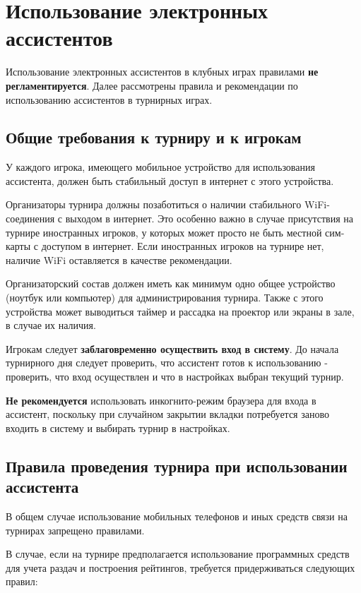 \section{Использование электронных ассистентов}

Использование электронных ассистентов в клубных играх правилами \textbf{не регламентируется}. Далее рассмотрены правила и рекомендации по использованию ассистентов в турнирных играх.

\subsection{Общие требования к турниру и к игрокам}

У каждого игрока, имеющего мобильное устройство для использования ассистента, должен быть стабильный доступ в интернет с этого устройства.

Организаторы турнира должны позаботиться о наличии стабильного WiFi-соединения с выходом в интернет. Это особенно важно в случае присутствия на турнире иностранных игроков, у которых может просто не быть местной сим-карты с доступом в интернет. Если иностранных игроков на турнире нет, наличие WiFi оставляется в качестве рекомендации.

Организаторский состав должен иметь как минимум одно общее устройство (ноутбук или компьютер) для администрирования турнира. Также с этого устройства может выводиться таймер и рассадка на проектор или экраны в зале, в случае их наличия.

Игрокам следует \textbf{заблаговременно осуществить вход в систему}. До начала турнирного дня следует проверить, что ассистент готов к использованию - проверить, что вход осуществлен и что в настройках выбран текущий турнир.

\textbf{Не рекомендуется} использовать инкогнито-режим браузера для входа в ассистент, поскольку при случайном закрытии вкладки потребуется заново входить в систему и выбирать турнир в настройках.

\subsection{Правила проведения турнира при использовании ассистента}

В общем случае использование мобильных телефонов и иных средств связи на турнирах запрещено правилами.

В случае, если на турнире предполагается использование программных средств для учета раздач и построения рейтингов, требуется придерживаться следующих правил:

